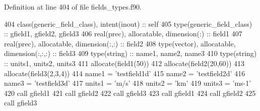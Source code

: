Definition at line 404 of file fields\+\_\+types.\+f90.


\begin{DoxyCode}
404     \textcolor{keywordtype}{class}(generic\_field\_class), \textcolor{keywordtype}{intent(inout)} :: self
405     \textcolor{keywordtype}{type}(generic\_field\_class) :: gfield1, gfield2, gfield3
406     \textcolor{keywordtype}{real(prec)}, \textcolor{keywordtype}{allocatable}, \textcolor{keywordtype}{dimension(:)} :: field1
407     \textcolor{keywordtype}{real(prec)}, \textcolor{keywordtype}{allocatable}, \textcolor{keywordtype}{dimension(:,:)} :: field2
408     \textcolor{keywordtype}{type}(vector), \textcolor{keywordtype}{allocatable}, \textcolor{keywordtype}{dimension(:,:,:)} :: field3
409     \textcolor{keywordtype}{type}(string) :: name1, name2, name3
410     \textcolor{keywordtype}{type}(string) :: units1, units2, units3
411     \textcolor{keyword}{allocate}(field1(50))
412     \textcolor{keyword}{allocate}(field2(20,60))
413     \textcolor{keyword}{allocate}(field3(2,3,4))
414     name1 = \textcolor{stringliteral}{'testfield1d'}
415     name2 = \textcolor{stringliteral}{'testfield2d'}
416     name3 = \textcolor{stringliteral}{'testfield3d'}
417     units1 = \textcolor{stringliteral}{'m/s'}
418     units2 = \textcolor{stringliteral}{'km'}
419     units3 = \textcolor{stringliteral}{'ms-1'}
420     \textcolor{keyword}{call }gfield1%
421     \textcolor{keyword}{call }gfield2%
422     \textcolor{keyword}{call }gfield3%
423     \textcolor{keyword}{call }gfield1%
424     \textcolor{keyword}{call }gfield2%
425     \textcolor{keyword}{call }gfield3%
\end{DoxyCode}
